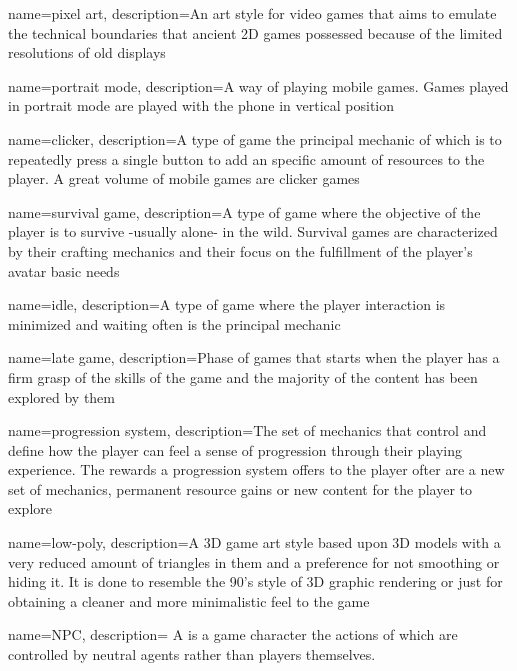 \makeglossaries

{
    name=pixel art,
    description={An art style for video games that aims to emulate the technical boundaries that ancient 2D games possessed because of the limited resolutions of old displays}
}

{
    name=portrait mode,
    description={A way of playing mobile games. Games played in portrait mode are played  with the phone in vertical position}
}

{
    name=clicker,
    description={A type of game the principal mechanic of which is to repeatedly press a single button to add an specific amount of resources to the player. A great volume of mobile games are clicker games}
}


{
    name=survival game,
    description={A type of game where the objective of the player is to survive -usually alone- in the wild. Survival games are characterized by their crafting mechanics and their focus on the fulfillment of the player's avatar basic needs}
}

{
    name=idle,
    description={A type of game where the player interaction is minimized and waiting often is the principal mechanic}
}

{
    name=late game,
    description={Phase of games that starts when the player has a firm grasp of the skills of the game and the majority of the content has been explored by them}
}

{
    name=progression system,
    description={The set of mechanics that control and define how the player can feel a sense of progression through their playing experience. The rewards a progression system offers to the player ofter are a new set of mechanics, permanent resource gains or new content for the player to explore}
}

{
    name=low-poly,
    description={A 3D game art style based upon 3D models with a very reduced amount of triangles in them and a preference for not smoothing or hiding it. It is done to resemble the 90's style of 3D graphic rendering or just for obtaining a cleaner and more minimalistic feel to the game}
}

{
	name={NPC},
		description={
			A  is a game character the actions of which are
			controlled by neutral agents rather than players themselves.
		}
}

